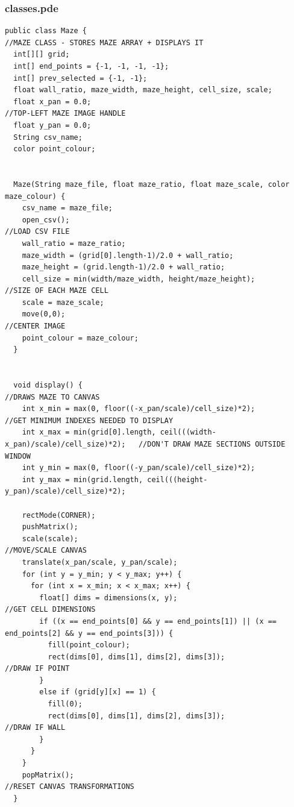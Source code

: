 \documentclass[titlepage]{article}
\begin{document}
\subsubsection{classes.pde}
\begin{changemargin}{-1in}{-1in} 
\begin{verbatim}
public class Maze {                                                             //MAZE CLASS - STORES MAZE ARRAY + DISPLAYS IT
  int[][] grid;                     
  int[] end_points = {-1, -1, -1, -1};
  int[] prev_selected = {-1, -1};
  float wall_ratio, maze_width, maze_height, cell_size, scale;
  float x_pan = 0.0;                                                            //TOP-LEFT MAZE IMAGE HANDLE
  float y_pan = 0.0;
  String csv_name;
  color point_colour;
  
  
  Maze(String maze_file, float maze_ratio, float maze_scale, color maze_colour) {
    csv_name = maze_file;
    open_csv();                                                                 //LOAD CSV FILE
    wall_ratio = maze_ratio;
    maze_width = (grid[0].length-1)/2.0 + wall_ratio;
    maze_height = (grid.length-1)/2.0 + wall_ratio;
    cell_size = min(width/maze_width, height/maze_height);                      //SIZE OF EACH MAZE CELL
    scale = maze_scale;
    move(0,0);                                                                  //CENTER IMAGE 
    point_colour = maze_colour;
  }
  
  
  void display() {                                                              //DRAWS MAZE TO CANVAS
    int x_min = max(0, floor((-x_pan/scale)/cell_size)*2);                      //GET MINIMUM INDEXES NEEDED TO DISPLAY
    int x_max = min(grid[0].length, ceil(((width-x_pan)/scale)/cell_size)*2);   //DON'T DRAW MAZE SECTIONS OUTSIDE WINDOW
    int y_min = max(0, floor((-y_pan/scale)/cell_size)*2);
    int y_max = min(grid.length, ceil(((height-y_pan)/scale)/cell_size)*2);
    
    rectMode(CORNER);
    pushMatrix();
    scale(scale);                                                               //MOVE/SCALE CANVAS
    translate(x_pan/scale, y_pan/scale);
    for (int y = y_min; y < y_max; y++) {
      for (int x = x_min; x < x_max; x++) {
        float[] dims = dimensions(x, y);                                        //GET CELL DIMENSIONS
        if ((x == end_points[0] && y == end_points[1]) || (x == end_points[2] && y == end_points[3])) {
          fill(point_colour);
          rect(dims[0], dims[1], dims[2], dims[3]);                             //DRAW IF POINT
        }
        else if (grid[y][x] == 1) {
          fill(0);
          rect(dims[0], dims[1], dims[2], dims[3]);                             //DRAW IF WALL
        }
      }
    }
    popMatrix();                                                                //RESET CANVAS TRANSFORMATIONS
  }
 

\end{verbatim}
\end{changemargin}
\end{document}
